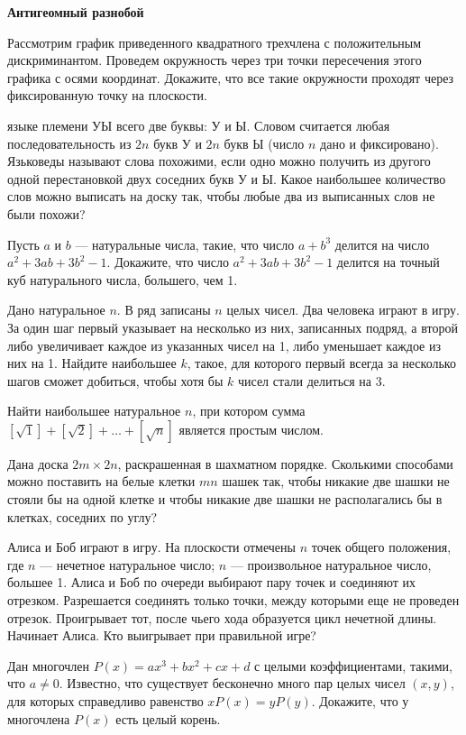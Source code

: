 \centerline{\bf \Huge Антигеомный разнобой}

Рассмотрим график приведенного квадратного трехчлена с положительным
дискриминантом. Проведем окружность через три точки пересечения этого
графика с осями координат. Докажите, что все такие окружности проходят
через фиксированную точку на плоскости.

 языке племени УЫ всего две буквы: У и Ы. Словом считается любая
последовательность из $2 n$ букв У и $2 n$ букв Ы (число $n$ дано и
фиксировано). Язьковеды называют слова похожими, если одно можно
получить из другого одной перестановкой двух соседних букв У и Ы. Какое
наибольшее количество слов можно выписать на доску так, чтобы любые два
из выписанных слов не были похожи?

Пусть $a$ и $b$ — натуральные числа, такие, что число $a+b^3$ делится на
число $a^2+3ab+3b^2-1$. Докажите, что число $a^2+3ab+3b^2-1$ делится на
точный куб натурального числа, большего, чем 1.

Дано натуральное $n$. В ряд записаны $n$ целых чисел. Два человека
играют в игру. За один шаг первый указывает на несколько из них,
записанных подряд, а второй либо увеличивает каждое из указанных чисел
на 1, либо уменьшает каждое из них на 1. Найдите наибольшее $k$, такое,
для которого первый всегда за несколько шагов сможет добиться, чтобы
хотя бы $k$ чисел стали делиться на 3.

Найти наибольшее натуральное $n$, при котором сумма
$[\sqrt{1}]+[\sqrt{2}]+\ldots+[\sqrt{n}]$ является простым числом.

Дана доска $2m\times 2n$, раскрашенная в шахматном порядке. Сколькими
способами можно поставить на белые клетки $mn$ шашек так, чтобы никакие
две шашки не стояли бы на одной клетке и чтобы никакие две шашки не
располагались бы в клетках, соседних по углу?

Алиса и Боб играют в игру. На плоскости отмечены $n$ точек общего
положения, где $n$ — нечетное натуральное число; $n$ — произвольное
натуральное число, большее 1. Алиса и Боб по очереди выбирают пару точек
и соединяют их отрезком. Разрешается соединять только точки, между
которыми еще не проведен отрезок. Проигрывает тот, после чьего хода
образуется цикл нечетной длины. Начинает Алиса. Кто выигрывает при
правильной игре?


\newpage

\centerline{}

Дан многочлен $P(x)=ax^3+bx^2+cx+d$ с целыми коэффициентами, такими, что
$a\neq 0$. Известно, что существует бесконечно много пар целых чисел
$(x,y)$, для которых справедливо равенство $xP(x)=yP(y)$. Докажите, что
у многочлена $P(x)$ есть целый корень.